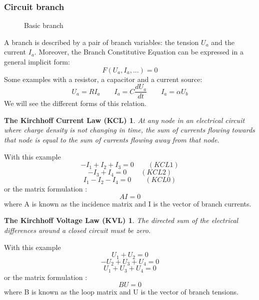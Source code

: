 \frame
{
  \frametitle{Circuit branch}
\begin{figure}[h]
\centerline{
 \scalebox{0.4}{
    
 }
}
\caption{Basic branch}
\end{figure}
A branch is described by a pair of branch variables: the tension $U_{a}$ and the current $I_{a}$.
Moreover, the Branch Constitutive Equation can be expressed in a general implicit form:
\begin{equation}\label{BCE}F(U_{a},I_{a},...)=0\end{equation}
Some examples with a resistor, a capacitor and a current source:
\[U_{a}=RI_{a} \qquad I_{a}=C\frac{dU_{a}}{dt} \qquad I_{a}=\alpha U_{b}\]
We will see the different forms of this relation.
  }

\frame
{
\newtheorem{kcl}{The Kirchhoff Current Law (KCL)}
\begin{kcl}
At any node in an electrical circuit where charge density is not changing in time, the sum of
currents flowing towards that node is equal to the sum of currents flowing away from that node.
\end{kcl}
\begin{figure}[h]
\centerline{
 \scalebox{0.35}{
    
 }
}
\end{figure}
With this example 
\[-I_{1}+I_{2}+I_{3}=0 \qquad (KCL1)\]
\[-I_{3}+I_{4}=0 \qquad (KCL2)\]
\[I_{1}-I_{2}-I_{4}=0 \qquad (KCL0)\]
or the matrix formulation :
\[AI=0\]
where A is known as the incidence matrix and I is the vector of branch currents.

}
\frame
{
\newtheorem{kvl}{The Kirchhoff Voltage Law (KVL)}
\begin{kvl}
The directed sum of the electrical differences around a closed circuit must be zero.
\end{kvl}
\begin{figure}[h]
\centerline{
 \scalebox{0.35}{
    
 }
}
\end{figure}
With this example 
\[U_{1}+U_{2}=0\]
\[ -U_{2}+U_{3}+U_{4}=0\]
\[ U_{1}+U_{3}+U_{4}=0\]
or the matrix formulation :
\[BU=0\]
where B is known as the loop matrix and U is the vector of branch tensions.
}

